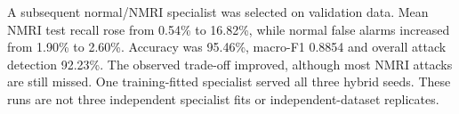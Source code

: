 A subsequent normal/NMRI specialist was selected on validation data. Mean NMRI test recall rose from 0.54\% to 16.82\%, while normal false alarms increased from 1.90\% to 2.60\%. Accuracy was 95.46\%, macro-F1 0.8854 and overall attack detection 92.23\%. The observed trade-off improved, although most NMRI attacks are still missed. One training-fitted specialist served all three hybrid seeds. These runs are not three independent specialist fits or independent-dataset replicates.
